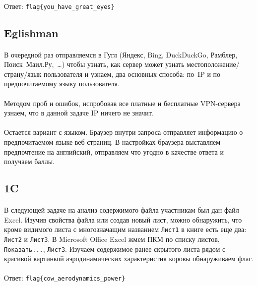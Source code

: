 \documentclass[12pt]{article}
\begin{document}
    \paragraph{}
    Ответ: \verb|flag{you_have_great_eyes}|


    \subsection{Eglishman}
	\paragraph{}
    В очередной раз отправляемся в Гугл (Яндекс, Bing, DuckDuckGo, Рамблер, Поиск~Маил.Ру,~\ldots)
	чтобы узнать, как сервер может узнать местоположение/страну/язык пользователя и узнаем, два основных способа:
	по~IP и по предпочитаемому языку пользователя.
    \paragraph{}
	Методом проб и ошибок, испробовав все платные и бесплатные VPN-сервера узнаем,
	что в данной задаче IP ничего не значит.
    \paragraph{}
	Остается вариант с языком.
	Браузер внутри запроса отправляет информацию о предпочитаемом языке веб-страниц.
	В настройках браузера выставляем предпочтение на английский, отправляем что угодно в качестве ответа и получаем баллы.


    \subsection{1C}
	\paragraph{}
    В следующей задаче на анализ содержимого файла участникам был дан файл Excel.
	Изучив свойства файла или создав новый лист, можно обнаружить,
	что кроме видимого листа с многозначащим названием \verb|Лист1| в книге есть еще два: \verb|Лист2| и \verb|Лист3|.
	В Microsoft Office Excel жмем ПКМ по списку листов, \verb|Показать...|, \verb|Лист3|.
	Изучаем содержимое ранее скрытого листа рядом с красивой картинкой аэродинамических характеристик коровы
	обнаруживаем флаг.
    \paragraph{}
    Ответ: \verb|flag{cow_aerodynamics_power}|
\end{document}

